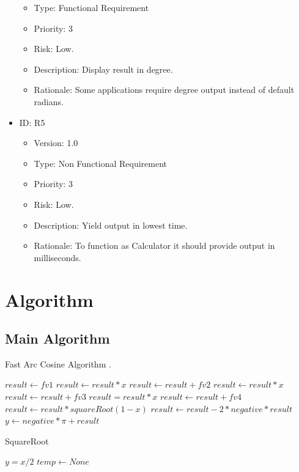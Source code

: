 \documentclass[a4paper,12pt]{article}
\begin{document}
\begin{itemize}
{\begin{itemize}
            \item{Type: Functional Requirement}
            \item{Priority: 3}
            \item {Risk: Low.}
            \item{Description: Display result in degree.}
            \item{Rationale: Some applications require degree output instead of default radians.}
        \end{itemize}}
        \item {ID: R5 
        \begin{itemize}
            \item {Version: 1.0}
            \item{Type: Non Functional Requirement}
            \item{Priority: 3}
            \item {Risk: Low.}
            \item{Description: Yield output in lowest time.}
            \item{Rationale: To function as Calculator it should provide output in milliseconds.}
        \end{itemize}}
    \end{itemize}
\pagebreak

\section{Algorithm}
    \subsection{Main Algorithm}
    \begin{algorithm}
    \caption{Fast Arc Cosine Algorithm \cite{Abramowitz Book}.}
    $result \gets  fv1$\;
    $result \gets result*x$\;
    $result \gets result +  fv2$\;
    $result \gets result*x$\;
    $result \gets result + fv3$\;
    $result= result*x$\;
    $result \gets result + fv4$\;
    $result \gets result* squareRoot(1-x)$\;
    $result \gets result- 2*negative*result$\;
    $y \gets negative * \pi + result$\;
    \end{algorithm}
    
    
    \begin{algorithm}
    \caption{SquareRoot}
    $y = x/2$\;
    $temp \gets None$\;
    \end{algorithm}
    
\end{document}
